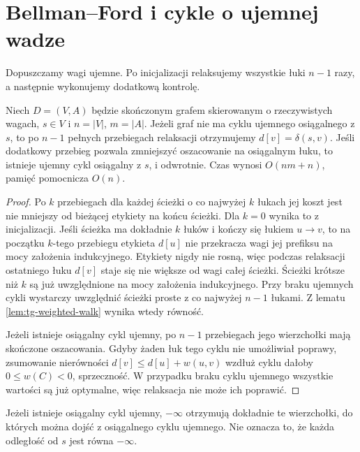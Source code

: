 \section{Bellman--Ford i cykle o ujemnej wadze}
\label{sec:tg-weighted-bellman}

Dopuszczamy wagi ujemne. Po inicjalizacji
relaksujemy wszystkie łuki $n-1$ razy,
a następnie wykonujemy dodatkową kontrolę.

\begin{twierdzenie}
\label{thm:tg-weighted-bellman}
Niech $D=(V,A)$ będzie skończonym grafem skierowanym
o rzeczywistych wagach, $s\in V$ i $n=|V|$, $m=|A|$.
Jeżeli graf nie ma cyklu ujemnego
osiągalnego z $s$, to po $n-1$
pełnych przebiegach relaksacji
otrzymujemy $d[v]=\delta(s,v)$.
Jeśli dodatkowy przebieg pozwala
zmniejszyć oszacowanie na
osiągalnym łuku, to istnieje
ujemny cykl osiągalny z $s$,
i odwrotnie. Czas wynosi
$O(nm+n)$, pamięć pomocnicza $O(n)$.
\end{twierdzenie}
\begin{proof}
Po $k$ przebiegach dla każdej ścieżki
o co najwyżej $k$ łukach jej koszt
jest nie mniejszy od bieżącej etykiety
na końcu ścieżki. Dla $k=0$ wynika to z inicjalizacji.
Jeśli ścieżka ma dokładnie $k$ łuków i kończy się
łukiem $u\to v$, to na początku $k$-tego przebiegu
etykieta $d[u]$ nie przekracza wagi jej prefiksu
na mocy założenia indukcyjnego. Etykiety nigdy
nie rosną, więc podczas relaksacji ostatniego łuku
$d[v]$ staje się nie większe od wagi całej ścieżki.
Ścieżki krótsze niż $k$ są już uwzględnione
na mocy założenia indukcyjnego.
Przy braku ujemnych cykli wystarczy
uwzględnić ścieżki proste z co
najwyżej $n-1$ łukami.
Z lematu \ref{lem:tg-weighted-walk}
wynika wtedy równość.

Jeżeli istnieje osiągalny cykl ujemny,
po $n-1$ przebiegach jego wierzchołki
mają skończone oszacowania.
Gdyby żaden łuk tego cyklu nie
umożliwiał poprawy, zsumowanie
nierówności $d[v]\leq d[u]+w(u,v)$
wzdłuż cyklu dałoby
$0\leq w(C)<0$, sprzeczność.
W przypadku braku cyklu ujemnego
wszystkie wartości są już optymalne,
więc relaksacja nie może ich poprawić.
\end{proof}

\begin{uwaga}
Jeżeli istnieje osiągalny cykl ujemny,
$-\infty$ otrzymują dokładnie
te wierzchołki, do których można
dojść z osiągalnego cyklu ujemnego.
Nie oznacza to, że każda odległość
od $s$ jest równa $-\infty$.
\end{uwaga}

